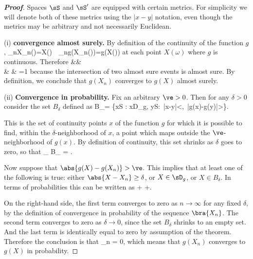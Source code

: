 \begin{proof}[\bf Proof]
Spaces $\sS$ and $\sS'$ are equipped with certain metrics. For simplicity we will denote both of these metrics using the $|x-y|$ notation, even though the metrics may be arbitrary and not necessarily Euclidean.
\ben
\item [(i)] {\bf convergence almost surely.} By definition of the continuity of the function $g$,
\be
\lim _{{n\to \infty }}X_{n}(\omega )=X(\omega )\ \ra\ \lim _{{n\to \infty }}g(X_{n}(\omega ))=g(X(\omega ))
\ee
at each point $X(\omega)$ where $g$ is continuous. Therefore
\beast
\pro{} &\geq & \pro{}\\
& \geq & \pro{}=1
\eeast
because the intersection of two almost sure events is almost sure. By definition, we conclude that $g(X_n)$ converges to $g(X)$ almost surely.

\item [(ii)] {\bf Convergence in probability.} Fix an arbitrary $\ve > 0$. Then for any $\delta > 0$ consider the set $B_{\delta}$ defined as
\be
B_\delta = \big\{x\in S : x\notin D_g, \exists y\in S:\ |x-y|<\delta,\, |g(x)-g(y)|>\varepsilon\big\}.
\ee

This is the set of continuity points $x$ of the function $g$ for which it is possible to find, within the $\delta$-neighborhood of $x$, a point which maps outside the $\ve$-neighborhood of $g(x)$. By definition of continuity, this set shrinks as $\delta$ goes to zero, so that
\be
\lim_{\delta {}}  B_{\delta} = \emptyset.
\ee

Now suppose that $\abs{g(X) - g(X_n)} > \ve$. This implies that at least one of the following is true: either $\abs{X-X_n} \geq \delta$, or $X \in \sD_g$, or $X\in B_{\delta}$. In terms of probabilities this can be written as
\be
\pro{} \leq \pro{} + \pro{}+\pro{}.
\ee

On the right-hand side, the first term converges to zero as $n \to \infty$ for any fixed $\delta$, by the definition of convergence in probability of the sequence $\bra{X_n}$. The second term converges to zero as $\delta \to 0$, since the set $B_\delta$ shrinks to an empty set. And the last term is identically equal to zero by assumption of the theorem. Therefore the conclusion is that
\be
\lim_{n\to\infty}\pro{} = 0,
\ee
which means that $g(X_n)$ converges to $g(X)$ in probability.


\end{proof}
